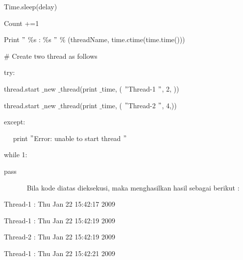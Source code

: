\documentclass{wileySix}
\begin{document}
\begin{myEnumerate}
\noindent 
{\fontsize{10pt}{10pt}\selectfont  \hspace*{0.5in} Time.sleep(delay)} \par
\noindent 
{\fontsize{10pt}{10pt}\selectfont  \hspace*{0.5in} Count +=1} \par
\noindent 
{\fontsize{10pt}{10pt}\selectfont  \hspace*{0.5in} Print  $ " $ $  \%  $s :  $  \%  $s $ " $  $  \%  $ (threadName, time.ctime(time.time()))} \par
\vspace{10pt}
\noindent 
{\fontsize{10pt}{10pt}\selectfont  $  \#  $ Create two thread as follows} \par
\noindent 
{\fontsize{10pt}{10pt}\selectfont try:} \par
\noindent 
{\fontsize{10pt}{10pt}\selectfont  thread.start $  \_  $new $  \_  $thread(print $  \_  $time, ( $ " $Thread-1 $ " $, 2, ))} \par
\noindent 
{\fontsize{10pt}{10pt}\selectfont  thread.start $  \_  $new $  \_  $thread(print $  \_  $time, ( $ " $Thread-2 $ " $, 4,))} \par
\noindent 
{\fontsize{10pt}{10pt}\selectfont except:} \par
\noindent 
{\fontsize{10pt}{10pt}\selectfont ~~ print  $ " $Error: unable to start thread $ " $} \par
\vspace{10pt}
\noindent 
{\fontsize{10pt}{10pt}\selectfont while 1:} \par
\noindent 
{\fontsize{10pt}{10pt}\selectfont pass} \par
\noindent 
~~~~~~ Bila kode diatas dieksekusi, maka menghasilkan hasil sebagai berikut : \par
\noindent 
\begin{center}{\fontsize{10pt}{10pt}\selectfont Thread-1 : Thu Jan 22 15:42:17 2009}\end{center} \par
\noindent 
\begin{center}{\fontsize{10pt}{10pt}\selectfont Thread-1 : Thu Jan 22 15:42:19 2009}\end{center} \par
\noindent 
\begin{center}{\fontsize{10pt}{10pt}\selectfont Thread-2 : Thu Jan 22 15:42:19 2009}\end{center} \par
\noindent 
\begin{center}{\fontsize{10pt}{10pt}\selectfont Thread-1 : Thu Jan 22 15:42:21 2009}\end{center} \par

\end{myEnumerate}
\end{document}
